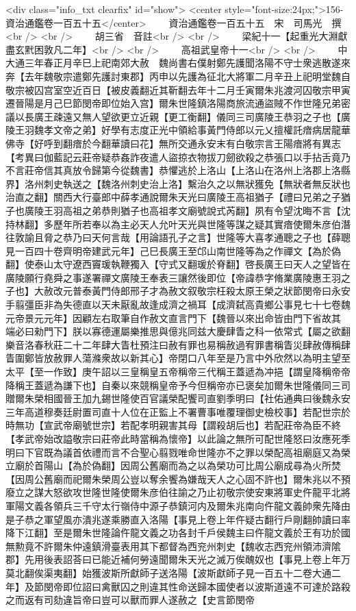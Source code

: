<div class="info_txt clearfix" id="show">
<center style="font-size:24px;">156-資治通鑑卷一百五十五</center>
  　　資治通鑑卷一百五十五　宋　司馬光　撰<br />
<br />
　　胡三省　音註<br />
<br />
　　梁紀十一【起重光大淵獻盡玄黓困敦凡二年】<br />
<br />
　　高祖武皇帝十一<br />
<br />
　　中大通三年春正月辛巳上祀南郊大赦　魏尚書右僕射鄭先護聞洛陽不守士衆逃散遂來奔【去年魏敬宗遣鄭先護討東郡】丙申以先護為征北大將軍二月辛丑上祀明堂魏自敬宗被囚宫室空近百日【被皮義翻近其靳翻去年十二月壬寅爾朱兆渡河囚敬宗甲寅遷晉陽是月己巳節閔帝即位始入宫】爾朱世隆鎮洛陽商旅流通盜賊不作世隆兄弟密議以長廣王疎遠又無人望欲更立近親【更工衡翻】儀同三司廣陵王恭羽之子也【廣陵王羽魏孝文帝之弟】好學有志度正光中領給事黃門侍郎以元乂擅權託瘖病居龍華佛寺【好呼到翻瘖於今翻華讀曰花】無所交通永安末有白敬宗言王陽瘖將有異志　【考異曰伽藍記云莊帝疑恭姦詐夜遣人盜掠衣物拔刀劒欲殺之恭張口以手拈舌竟乃不言莊帝信其真放令歸第今從魏書】恭懼逃於上洛山【上洛山在洛州上洛郡上洛縣界】洛州刺史執送之【魏洛州刺史治上洛】繫治久之以無狀獲免【無狀者無反狀也治直之翻】關西大行臺郎中薛孝通說爾朱天光曰廣陵王高祖猶子【禮曰兄弟之子猶子也廣陵王羽高祖之弟恭則猶子也高祖孝文廟號說式芮翻】夙有令望沈晦不言【沈持林翻】多歷年所若奉以為主必天人允叶天光與世隆等謀之疑其實瘖使爾朱彦伯潛往敦諭且脅之恭乃曰天何言哉【用論語孔子之言】世隆等大喜孝通聰之子也【薛聰見一百四十卷齊明帝建武元年】己巳長廣王至邙山南世隆等為之作禪文【為於偽翻】使泰山太守遼西竇瑗執鞭獨入【守式又翻瑗於脊翻】啓長廣王曰天人之望皆在廣陵願行堯舜之事遂署禪文廣陵王奉表三讓然後即位【帝諱恭字脩業廣陵惠王羽之子也】大赦改元普泰黃門侍郎邢子才為赦文叙敬宗枉殺太原王榮之狀節閔帝曰永安手翦彊臣非為失德直以天未厭亂故逢成濟之禍耳【成濟弑高貴鄉公事見七十七卷魏元帝景元元年】因顧左右取筆自作赦文直言門下【魏晉以來出命皆由門下省故其端必曰勑門下】朕以寡德運屬樂推思與億兆同兹大慶肆眚之科一依常式【屬之欲翻樂音洛春秋莊二十二年肆大眚杜預注曰赦有罪也易稱赦過宥罪書稱眚災肆赦傳稱肆眚圍鄭皆放赦罪人蕩滌衆故以新其心】帝閉口八年至是乃言中外欣然以為明主望至太平【至一作致】庚午詔以三皇稱皇五帝稱帝三代稱王蓋遞為冲挹【謂皇降稱帝帝降稱王蓋遞為謙下也】自秦以來競稱皇帝予今但稱帝亦已褒矣加爾朱世隆儀同三司贈爾朱榮相國晉王加九錫世隆使百官議榮配饗司直劉季明曰【社佑通典曰後魏永安三年高道穆奏廷尉置司直十人位在正監上不署曹事唯覆理御史檢校事】若配世宗於時無功【宣武帝廟號世宗】若配孝明親害其母【謂殺胡后也】若配莊帝為臣不終【孝武帝始改謚敬宗曰莊帝此時當稱為懷帝】以此論之無所可配世隆怒曰汝應死季明曰下官既為議首依禮而言不合聖心翦戮唯命世隆亦不之罪以榮配高祖廟庭又為榮立廟於首陽山【為於偽翻】因周公舊廟而為之以為榮功可比周公廟成尋為火所焚【因周公舊廟而祀爾朱榮周公豈以奪余饗為嫌哉天人之心固不許也】爾朱兆以不預廢立之謀大怒欲攻世隆世隆使爾朱彦伯往諭之乃止初敬宗使安東將軍史仵龍平北將軍陽文義各領兵三千守太行嶺侍中源子恭鎮河内及爾朱兆南向仵龍文義帥衆先降由是子恭之軍望風亦潰兆遂乘勝直入洛陽【事見上卷上年仵疑古翻行戶剛翻帥讀曰率降下江翻】至是爾朱世隆論仵龍文義之功各封千戶侯魏主曰仵龍文義於王有功於國無勲竟不許爾朱仲遠鎮滑臺表用其下都督為西兖州刺史【魏收志西兖州領沛濟隂郡】先用後表詔荅曰已能近補何勞遠聞爾朱天光之滅万俟醜奴也【事見上卷上年万莫北翻俟渠夷翻】始獲波斯所獻師子送洛陽【波斯獻師子見一百五十二卷大通二年】及節閔帝即位詔曰禽獸囚之則違其性命送歸本國使者以波斯道遠不可達於路殺之而返有司劾違旨帝曰豈可以獸而罪人遂赦之【史言節閔帝